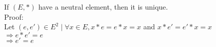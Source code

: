\documentclass{article}
\begin{document}
If $(E, *)$ have a neutral element, then it is unique.\\

\noindent Proof:\\
Let $(e, e') \in E^2 \mid \forall x \in E, x * e = e * x
= x $ and $ x * e' = e' * x = x $\\
$\Rightarrow e * e' = e $\\
$\Rightarrow e' = e $\\
\end{document}
